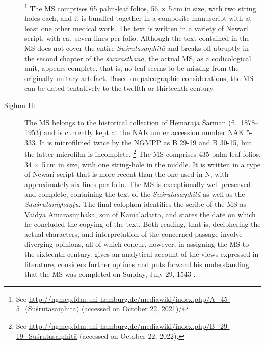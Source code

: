 \begin{description}
    \footnote{%
See 
\url{http://ngmcp.fdm.uni-hamburg.de/mediawiki/index.php/A_45-5_(Suśrutasaṃhitā)}
 (accessed on October 22, 2021)/
    } 
The MS comprises 65 palm-leaf folios, 56 $\times$ 5\,cm in size, with two string holes each, 
and it is bundled together in a composite manuscript with at least one other medical work. 
The text is written in a variety of Newari script, with ca.\ seven lines per folio. Although the 
text contained in the MS does not cover the entire \emph{Suśrutasaṃhitā} and breaks off 
abruptly in the second chapter of the \emph{śārīrasthāna}, the actual MS, as a codicological 
unit, appears complete, that is, no leaf seems to be missing from the originally unitary 
artefact. Based on paleographic considerations, the MS can be dated tentatively to the twelfth 
or thirteenth century.

\item[Siglum H:] The MS belongs to the historical collection of Hemarāja Śarman (fl.\ 
1878--1953) and is currently kept at the NAK under accession number NAK 5-333. It is 
microfilmed twice by the NGMPP as B 29-19 and B 30-15, but the latter microfilm is 
incomplete.%
    \footnote{%
    See 
    \url{http://ngmcp.fdm.uni-hamburg.de/mediawiki/index.php/B_29-19_Suśrutasaṃhitā}
     (accessed on October 22, 2022).
    } 
The MS comprises 435 palm-leaf folios, 34 $\times$ 5\,cm in size, with one string-hole in the 
middle. It is written in a type of Newari script that is more recent than the one used in N, with 
approximately six lines per folio. The MS is exceptionally well-preserved and complete, 
containing the text of the \emph{Suśrutasaṃhitā} as well as the \emph{Sauśrutanighaṇṭu}. 
The final colophon identifies the scribe of the MS as Vaidya Amarasiṃhaka, son of 
Kamaladatta, and states the date on which he concluded the copying of the text. Both 
reading, that is, deciphering the actual characters, and interpretation of the concerned 
passage involve diverging opinions, all of which concur, however, in assigning the MS to the 
sixteenth century. \textcites[21--26]{kleb-2021b} gives an analytical account of the views 
expressed in literature, considers further options and puts forward his understanding that the 
MS was completed on Sunday, July 29, 1543 \CE.  
\end{description}
  

